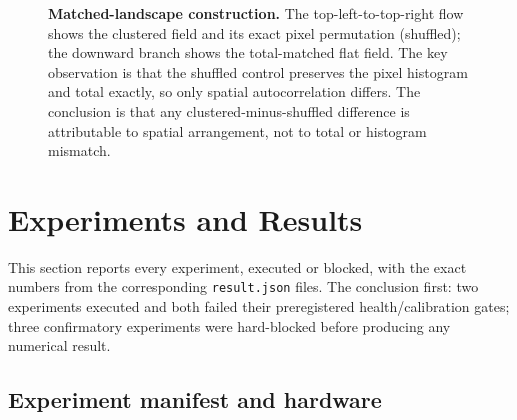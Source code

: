 \documentclass[11pt,a4paper]{article}
\newcommand{\code}[1]{\texttt{#1}}
\begin{document}
\begin{figure}[htbp]
\centering
{}
\caption{\textbf{Matched-landscape construction.} The top-left-to-top-right flow
shows the clustered field and its exact pixel permutation (shuffled); the
downward branch shows the total-matched flat field. The key observation is that
the shuffled control preserves the pixel histogram and total exactly, so only
spatial autocorrelation differs. The conclusion is that any
clustered-minus-shuffled difference is attributable to spatial arrangement, not
to total or histogram mismatch.}
\label{fig:matched}
\end{figure}

\section{Experiments and Results}
\label{sec:experiments}

This section reports every experiment, executed or blocked, with the exact
numbers from the corresponding \code{result.json} files. The conclusion first:
two experiments executed and both failed their preregistered health/calibration
gates; three confirmatory experiments were hard-blocked before producing any
numerical result.

\subsection{Experiment manifest and hardware}
\label{sec:manifest}
\end{document}
